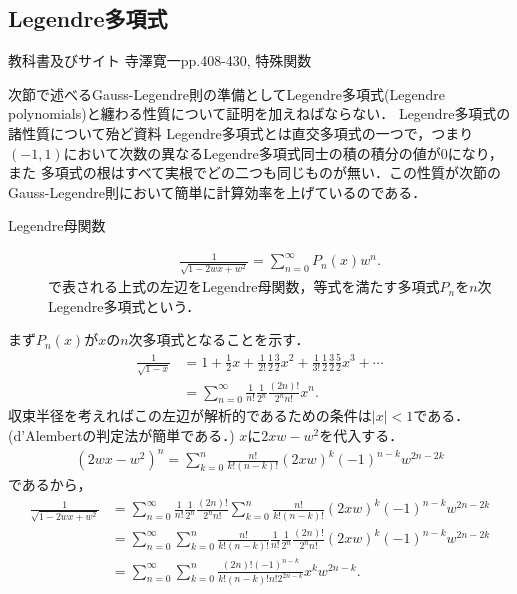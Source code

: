 \documentclass[a4j,papersize,disablejfam,slide,14pt]{jsarticle}
\begin{document}
\subsection{{\rm Legendre}多項式}
	\begin{itembox}[l]{教科書及びサイト}
    	{\rm 寺澤寛一\cite{terakan}pp.408-430, 特殊関数\cite{legendre_polynomials}}
    \end{itembox}
	次節で述べる{\rm Gauss-Legendre}則の準備として{\rm Legendre}多項式({\rm Legendre polynomials})と纏わる性質について証明を加えねばならない．
    {\rm Legendre}多項式の諸性質について殆ど資料%
    {\rm Legendre}多項式とは直交多項式の一つで，つまり$(-1, 1)$において次数の異なる{\rm Legendre}多項式同士の積の積分の値が$0$になり，また
    多項式の根はすべて実根でどの二つも同じものが無い．この性質が次節の{\rm Gauss-Legendre}則において簡単に計算効率を上げているのである．
    \begin{screen}
    	\begin{description}
        \item[{\rm Legendre}母関数]
        	\begin{align}
            	\frac{1}{\sqrt{1 - 2wx + w^2}} = \sum_{n=0}^{\infty} P_n(x) w^n. \label{eq:legendre_generating}
            \end{align}
            で表される上式の左辺を{\rm Legendre}母関数，等式を満たす多項式$P_n$を$n$次{\rm Legendre}多項式という．
    	\end{description}
    \end{screen}
    まず$P_n(x)$が$x$の$n$次多項式となることを示す．
    \begin{align}
    	\frac{1}{\sqrt{1-x}} &= 1 + \frac{1}{2}x + \frac{1}{2!}\frac{1}{2}\frac{3}{2}x^2 + \frac{1}{3!}\frac{1}{2}\frac{3}{2}\frac{5}{2}x^3 + \cdots \\
        &= \sum_{n=0}^{\infty} \frac{1}{n!}\frac{1}{2^n}\frac{(2n)!}{2^n n!} x^n.
    \end{align}
    収束半径を考えればこの左辺が解析的であるための条件は$|x|<1$である．({\rm d'Alembert}の判定法が簡単である．)
    $x$に$2xw - w^2$を代入する．
    \begin{align}
    	(2wx - w^2)^n = \sum_{k=0}^{n} \frac{n!}{k!(n-k)!} (2xw)^k (-1)^{n-k} w^{2n-2k}
    \end{align}
    であるから，
    \begin{align}
    	\frac{1}{\sqrt{1 - 2wx + w^2}} &= \sum_{n=0}^{\infty} \frac{1}{n!}\frac{1}{2^n}\frac{(2n)!}{2^n n!} \sum_{k=0}^{n} \frac{n!}{k!(n-k)!} (2xw)^k (-1)^{n-k} w^{2n-2k} \\
        &= \sum_{n=0}^{\infty} \sum_{k=0}^{n} \frac{n!}{k!(n-k)!} \frac{1}{n!}\frac{1}{2^n}\frac{(2n)!}{2^n n!} (2xw)^k (-1)^{n-k} w^{2n-2k} \\
        &= \sum_{n=0}^{\infty} \sum_{k=0}^{n} \frac{(2n)! (-1)^{n-k}}{k!(n-k)!n!2^{2n-k}} x^k w^{2n-k}.
    \end{align}
\end{document}
